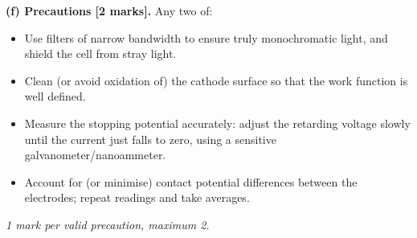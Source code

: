 \documentclass[11pt]{article}
\begin{document}
\begin{corrige}
\textbf{(f) Precautions [2 marks].} Any two of:
\begin{itemize}
\item Use filters of narrow bandwidth to ensure truly monochromatic light, and shield the cell from stray light.
\item Clean (or avoid oxidation of) the cathode surface so that the work function is well defined.
\item Measure the stopping potential accurately: adjust the retarding voltage slowly until the current just falls to zero, using a sensitive galvanometer/nanoammeter.
\item Account for (or minimise) contact potential differences between the electrodes; repeat readings and take averages.
\end{itemize}
\emph{1 mark per valid precaution, maximum 2.}
\end{corrige}
\end{document}
